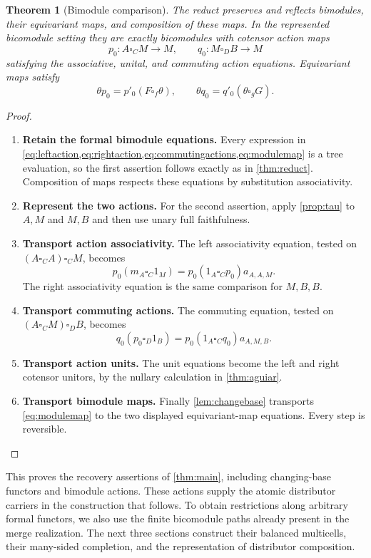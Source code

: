 \documentclass[11pt,reqno]{amsart}
\theoremstyle{plain}
\newtheorem{theorem}{Theorem}[section]
\theoremstyle{definition}
\theoremstyle{remark}
\numberwithin{equation}{section}
\begin{document}
\begin{theorem}[Bimodule comparison]\label{thm:bimodules}
The reduct preserves and reflects bimodules, their equivariant maps, and
composition of these maps. In the represented bicomodule setting they
are exactly bicomodules with cotensor action maps
\[
 p_0:A\square_C M\to M,\qquad
 q_0:M\square_D B\to M
\]
satisfying the associative, unital, and commuting action equations.
Equivariant maps satisfy
\[
 \theta p_0=p'_0(F\square_f\theta),\qquad
 \theta q_0=q'_0(\theta\square_g G).
\]
\end{theorem}
\begin{proof}\leavevmode
\begin{enumerate}
\item \textbf{Retain the formal bimodule equations.} Every expression in
\cref{eq:leftaction,eq:rightaction,eq:commutingactions,eq:modulemap}
is a tree evaluation, so the first assertion follows exactly as in
\cref{thm:reduct}. Composition of maps respects these equations by
substitution associativity.

\item \textbf{Represent the two actions.} For the second assertion, apply \cref{prop:tau} to $A,M$ and $M,B$
and then use unary full faithfulness.

\item \textbf{Transport action associativity.} The left associativity equation,
tested on $(A\square_C A)\square_C M$, becomes
\[
 p_0(m_A\square_C1_M)
   =p_0(1_A\square_Cp_0)a_{A,A,M}.
\]
The right associativity equation is the same comparison for $M,B,B$.

\item \textbf{Transport commuting actions.} The commuting equation, tested on $(A\square_C M)\square_D B$,
becomes
\[
 q_0(p_0\square_D1_B)
   =p_0(1_A\square_Cq_0)a_{A,M,B}.
\]

\item \textbf{Transport action units.} The unit equations become the left and right cotensor unitors, by the
nullary calculation in \cref{thm:aguiar}.

\item \textbf{Transport bimodule maps.} Finally
\cref{lem:changebase} transports \cref{eq:modulemap} to the two
displayed equivariant-map equations. Every step is reversible.\qedhere
\end{enumerate}
\end{proof}

This proves the recovery assertions of \cref{thm:main}, including
changing-base functors and bimodule actions. These actions supply the
atomic distributor carriers in the construction that follows. To obtain
restrictions along arbitrary formal functors, we also use the finite
bicomodule paths already present in the merge realization. The next three
sections construct their balanced multicells, their many-sided completion,
and the representation of distributor composition.
\end{document}
